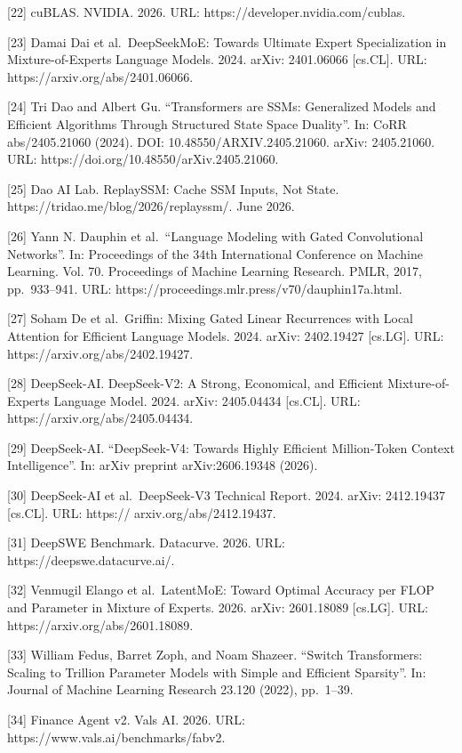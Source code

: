 \documentclass[
  10
]{article}
\begin{document}
{[}22{]} cuBLAS. NVIDIA. 2026. URL: https://developer.nvidia.com/cublas.

{[}23{]} Damai Dai et al.~DeepSeekMoE: Towards Ultimate Expert
Specialization in Mixture-of-Experts Language Models. 2024. arXiv:
2401.06066 {[}cs.CL{]}. URL: https://arxiv.org/abs/2401.06066.

{[}24{]} Tri Dao and Albert Gu. ``Transformers are SSMs: Generalized
Models and Efficient Algorithms Through Structured State Space
Duality''. In: CoRR abs/2405.21060 (2024). DOI:
10.48550/ARXIV.2405.21060. arXiv: 2405.21060. URL:
https://doi.org/10.48550/arXiv.2405.21060.

{[}25{]} Dao AI Lab. ReplaySSM: Cache SSM Inputs, Not State.
https://tridao.me/blog/2026/replayssm/. June 2026.

{[}26{]} Yann N. Dauphin et al.~``Language Modeling with Gated
Convolutional Networks''. In: Proceedings of the 34th International
Conference on Machine Learning. Vol. 70. Proceedings of Machine Learning
Research. PMLR, 2017, pp.~933--941. URL:
https://proceedings.mlr.press/v70/dauphin17a.html.

{[}27{]} Soham De et al.~Griffin: Mixing Gated Linear Recurrences with
Local Attention for Efficient Language Models. 2024. arXiv: 2402.19427
{[}cs.LG{]}. URL: https://arxiv.org/abs/2402.19427.

{[}28{]} DeepSeek-AI. DeepSeek-V2: A Strong, Economical, and Efficient
Mixture-of-Experts Language Model. 2024. arXiv: 2405.04434 {[}cs.CL{]}.
URL: https://arxiv.org/abs/2405.04434.

{[}29{]} DeepSeek-AI. ``DeepSeek-V4: Towards Highly Efficient
Million-Token Context Intelligence''. In: arXiv preprint
arXiv:2606.19348 (2026).

{[}30{]} DeepSeek-AI et al.~DeepSeek-V3 Technical Report. 2024. arXiv:
2412.19437 {[}cs.CL{]}. URL: https:// arxiv.org/abs/2412.19437.

{[}31{]} DeepSWE Benchmark. Datacurve. 2026. URL:
https://deepswe.datacurve.ai/.

{[}32{]} Venmugil Elango et al.~LatentMoE: Toward Optimal Accuracy per
FLOP and Parameter in Mixture of Experts. 2026. arXiv: 2601.18089
{[}cs.LG{]}. URL: https://arxiv.org/abs/2601.18089.

{[}33{]} William Fedus, Barret Zoph, and Noam Shazeer. ``Switch
Transformers: Scaling to Trillion Parameter Models with Simple and
Efficient Sparsity''. In: Journal of Machine Learning Research 23.120
(2022), pp.~1--39.

{[}34{]} Finance Agent v2. Vals AI. 2026. URL:
https://www.vals.ai/benchmarks/fabv2.
\end{document}
